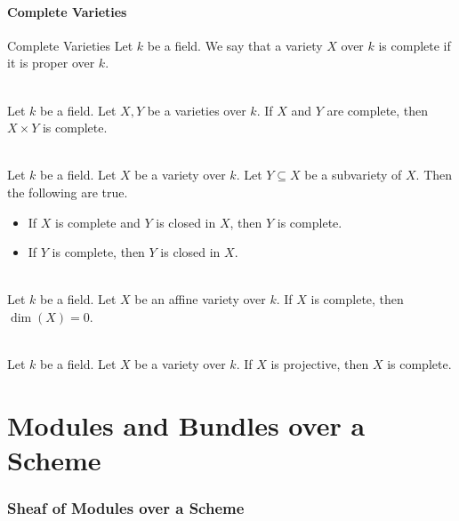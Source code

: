 \documentclass[a4paper]{article}
\begin{document}
\subsection{Complete Varieties}
\begin{defn}{Complete Varieties}{} Let $k$ be a field. We say that a variety $X$ over $k$ is complete if it is proper over $k$. 
\end{defn}

\begin{lmm}{}{}\\
Let $k$ be a field. Let $X,Y$ be a varieties over $k$. If $X$ and $Y$ are complete, then $X\times Y$ is complete. 
\end{lmm}

\begin{prp}{}{}\\
Let $k$ be a field. Let $X$ be a variety over $k$. Let $Y\subseteq X$ be a subvariety of $X$. Then the following are true. 
\begin{itemize}
\item If $X$ is complete and $Y$ is closed in $X$, then $Y$ is complete. 
\item If $Y$ is complete, then $Y$ is closed in $X$. 
\end{itemize}
\end{prp}

\begin{lmm}{}{}\\
Let $k$ be a field. Let $X$ be an affine variety over $k$. If $X$ is complete, then $\dim(X)=0$. 
\end{lmm}

\begin{prp}{}{}\\
Let $k$ be a field. Let $X$ be a variety over $k$. If $X$ is projective, then $X$ is complete. 
\end{prp}

\pagebreak

\part{Modules and Bundles over a Scheme}

\pagebreak
\section{Sheaf of Modules over a Scheme}
\end{document}
